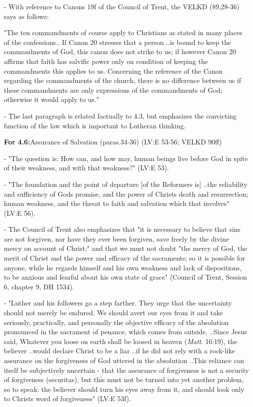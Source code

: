 - With reference to Canons 19f of the Council of Trent, the VELKD
(89,28-36) says as follows:

"The ten commandments of course apply to Christians as stated in many
places of the confessions.. If Canon 20 stresses that a person ..is
bound to keep the commandments of God, this canon does not strike to us;
if however Canon 20 affirms that faith has salvific power only on
condition of keeping the commandments this applies to us. Concerning the
reference of the Canon regarding the commandments of the church, there
is no difference between us if these commandments are only expressions
of the commandments of God; otherwise it would apply to us."

- The last paragraph is related factually to 4.3, but emphasizes the
\textquotesingle convicting function\textquotesingle{} of the law which
is important to Lutheran thinking.

\textbf{For 4.6:}Assurance of Salvation (paras.34-36) (LV:E 53-56; VELKD
90ff)

- "The question is: How can, and how may, human beings live before God
in spite of their weakness, and with that weakness?" (LV:E 53).

- "The foundation and the point of departure {[}of the Reformers is{]}
..the reliability and sufficiency of God\textquotesingle s promise, and
the power of Christ\textquotesingle s death and resurrection; human
weakness, and the threat to faith and salvation which that involves"
(LV:E 56).

- The Council of Trent also emphasizes that "it is necessary to believe
that sins are not forgiven, nor have they ever been forgiven, save
freely by the divine mercy on account of Christ;" and that we must not
doubt "the mercy of God, the merit of Christ and the power and efficacy
of the sacraments; so it is possible for anyone, while he regards
himself and his own weakness and lack of dispositions, to be anxious and
fearful about his own state of grace" (Council of Trent, Session 6,
chapter 9, DH 1534).

- "Luther and his followers go a step farther. They urge that the
uncertainty should not merely be endured. We should avert our eyes from
it and take seriously, practically, and personally the objective
efficacy of the absolution pronounced in the sacrament of penance, which
comes \textquotesingle from outside.\textquotesingle{} ..Since Jesus
said, \textquotesingle Whatever you loose on earth shall be loosed in
heaven\textquotesingle{} (\emph{Matt}. 16:19), the believer ..would
declare Christ to be a liar ..if he did not rely with a rock-like
assurance on the forgiveness of God uttered in the absolution ..This
reliance can itself be subjectively uncertain - that the assurance of
forgiveness is not a security of forgiveness (securitas); but this must
not be turned into yet another problem, so to speak: the believer should
turn his eyes away from it, and should look only to
Christ\textquotesingle s word of forgiveness" (LV:E 53f).

